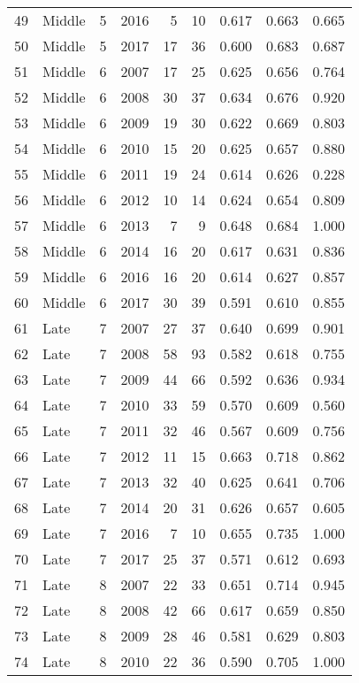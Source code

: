 \begin{table}[ht]
\begin{tabular}{rlllrrrrr}
  49 & Middle & 5 & 2016 & 5 & 10 & 0.617 & 0.663 & 0.665 \\ 
  50 & Middle & 5 & 2017 & 17 & 36 & 0.600 & 0.683 & 0.687 \\ 
  51 & Middle & 6 & 2007 & 17 & 25 & 0.625 & 0.656 & 0.764 \\ 
  52 & Middle & 6 & 2008 & 30 & 37 & 0.634 & 0.676 & 0.920 \\ 
  53 & Middle & 6 & 2009 & 19 & 30 & 0.622 & 0.669 & 0.803 \\ 
  54 & Middle & 6 & 2010 & 15 & 20 & 0.625 & 0.657 & 0.880 \\ 
  55 & Middle & 6 & 2011 & 19 & 24 & 0.614 & 0.626 & 0.228 \\ 
  56 & Middle & 6 & 2012 & 10 & 14 & 0.624 & 0.654 & 0.809 \\ 
  57 & Middle & 6 & 2013 & 7 & 9 & 0.648 & 0.684 & 1.000 \\ 
  58 & Middle & 6 & 2014 & 16 & 20 & 0.617 & 0.631 & 0.836 \\ 
  59 & Middle & 6 & 2016 & 16 & 20 & 0.614 & 0.627 & 0.857 \\ 
  60 & Middle & 6 & 2017 & 30 & 39 & 0.591 & 0.610 & 0.855 \\ 
  61 & Late & 7 & 2007 & 27 & 37 & 0.640 & 0.699 & 0.901 \\ 
  62 & Late & 7 & 2008 & 58 & 93 & 0.582 & 0.618 & 0.755 \\ 
  63 & Late & 7 & 2009 & 44 & 66 & 0.592 & 0.636 & 0.934 \\ 
  64 & Late & 7 & 2010 & 33 & 59 & 0.570 & 0.609 & 0.560 \\ 
  65 & Late & 7 & 2011 & 32 & 46 & 0.567 & 0.609 & 0.756 \\ 
  66 & Late & 7 & 2012 & 11 & 15 & 0.663 & 0.718 & 0.862 \\ 
  67 & Late & 7 & 2013 & 32 & 40 & 0.625 & 0.641 & 0.706 \\ 
  68 & Late & 7 & 2014 & 20 & 31 & 0.626 & 0.657 & 0.605 \\ 
  69 & Late & 7 & 2016 & 7 & 10 & 0.655 & 0.735 & 1.000 \\ 
  70 & Late & 7 & 2017 & 25 & 37 & 0.571 & 0.612 & 0.693 \\ 
  71 & Late & 8 & 2007 & 22 & 33 & 0.651 & 0.714 & 0.945 \\ 
  72 & Late & 8 & 2008 & 42 & 66 & 0.617 & 0.659 & 0.850 \\ 
  73 & Late & 8 & 2009 & 28 & 46 & 0.581 & 0.629 & 0.803 \\ 
  74 & Late & 8 & 2010 & 22 & 36 & 0.590 & 0.705 & 1.000 \\ 

\end{tabular}
\end{table}
